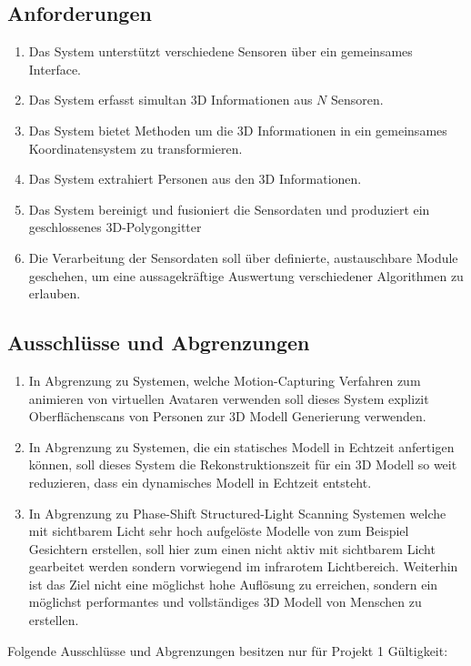 \subsection{Anforderungen}
\begin{enumerate}
	\item Das System unterstützt verschiedene Sensoren über ein gemeinsames Interface.
	\item Das System erfasst simultan 3D Informationen aus $N$ Sensoren.
	\item Das System bietet Methoden um die 3D Informationen in ein gemeinsames Koordinatensystem zu transformieren.
	\item Das System extrahiert Personen aus den 3D Informationen.
	\item Das System bereinigt und fusioniert die Sensordaten und produziert ein geschlossenes 3D-Polygongitter
	\item Die Verarbeitung der Sensordaten soll über definierte, austauschbare Module geschehen, um eine aussagekräftige Auswertung verschiedener Algorithmen zu erlauben.
\end{enumerate}

\subsection{Ausschlüsse und Abgrenzungen}

\begin{enumerate}
	\item In Abgrenzung zu Systemen, welche Motion-Capturing Verfahren zum animieren von virtuellen Avataren verwenden soll dieses System explizit Oberflächenscans von Personen zur 3D Modell Generierung verwenden.
	\item In Abgrenzung zu Systemen, die ein statisches Modell in Echtzeit anfertigen können, soll dieses System die Rekonstruktionszeit für ein 3D Modell so weit reduzieren, dass ein dynamisches Modell in Echtzeit entsteht.
	\item In Abgrenzung zu Phase-Shift Structured-Light Scanning Systemen welche mit sichtbarem Licht sehr hoch aufgelöste Modelle von zum Beispiel Gesichtern erstellen, soll hier zum einen nicht aktiv mit sichtbarem Licht gearbeitet werden sondern vorwiegend im infrarotem Lichtbereich. Weiterhin ist das Ziel nicht eine möglichst hohe Auflösung zu erreichen, sondern ein möglichst performantes und vollständiges 3D Modell von Menschen zu erstellen.
\end{enumerate}

Folgende Ausschlüsse und Abgrenzungen besitzen nur für Projekt 1 Gültigkeit:

